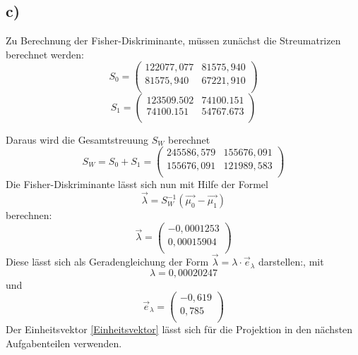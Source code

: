 \subsection{c)}
Zu Berechnung der Fisher-Diskriminante, müssen zunächst die Streumatrizen berechnet werden:
\begin{equation*}
  S_0 = \begin{pmatrix}
                  122077,077 & 81575,940 \\
                  81575,940 & 67221,910 \\
  \end{pmatrix}
\end{equation*}
\begin{equation*}
  S_1 = \begin{pmatrix}
                  123509.502 & 74100.151 \\
                  74100.151 & 54767.673 \\
  \end{pmatrix}
\end{equation*}

Daraus wird die Gesamtstreuung $S_W$ berechnet
\begin{equation*}
  S_W = S_0 + S_1= \begin{pmatrix}
                  245586,579 & 155676,091 \\
                  155676,091 & 121989,583 \\
  \end{pmatrix}
\end{equation*}
Die Fisher-Diskriminante lässt sich nun mit Hilfe der Formel
\begin{equation}
  \vec{\lambda} = S_W^{-1} (\vec{\mu_0} - \vec{\mu_1})
\end{equation}
berechnen:
\begin{equation*}
  \vec{\lambda} = \begin{pmatrix}
                  -0,0001253 \\
                  0,00015904 \\
  \end{pmatrix}
\end{equation*}
Diese lässt sich als Geradengleichung der Form $\vec{\lambda} = \lambda \cdot \vec{e}_{\lambda}$  darstellen:, mit
\begin{equation*}
  \lambda = 0,00020247
\end{equation*}
und
\begin{equation}
  \label{Einheitsvektor}
  \vec{e}_{\lambda} = \begin{pmatrix}
                  -0,619 \\
                  0,785 \\
  \end{pmatrix}
\end{equation}
Der Einheitsvektor \eqref{Einheitsvektor} lässt sich für die Projektion in den nächsten Aufgabenteilen verwenden.

